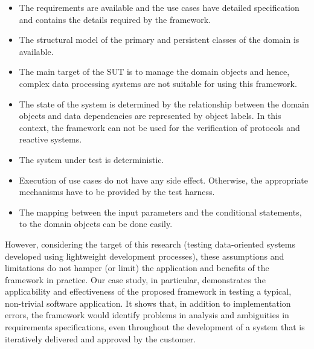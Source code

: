 \begin{itemize}
	\item The requirements are available and the use cases have detailed specification and contains the details required by the framework.
	
	\item The structural model of the primary and persistent classes of the domain is available.
	
	\item  The main target of the SUT is to manage the domain objects and hence, complex data processing systems are not suitable for using this framework.
	
	\item The state of the system is determined by the relationship between the domain objects and data dependencies are represented by object labels. In this context, the framework can not be used for the verification of protocols and reactive systems. 
	
	\item The system under test is deterministic.
	
	\item Execution of use cases do not have any side effect. Otherwise, the appropriate mechanisms have to be provided by the test harness.
	
	\item The mapping between the input parameters and the conditional statements, to the domain objects can be done easily.
\end{itemize}

However, considering the target of this research (testing data-oriented systems developed using lightweight development processes), these assumptions and limitations do not hamper (or limit) the application and benefits of the framework in practice. Our case study, in particular, demonstrates the applicability and effectiveness of the proposed framework in testing a typical, non-trivial software application. It shows that, in addition to implementation errors, the framework would identify problems in analysis and ambiguities in requirements specifications, even throughout the development of a system that is iteratively delivered and approved by the customer.
